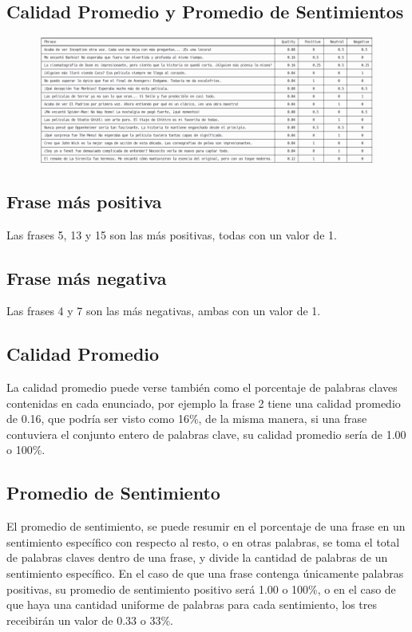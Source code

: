 \documentclass{article}
\begin{document}
    \newpage

    \subsection{Calidad Promedio y Promedio de Sentimientos}
    \begin{figure}[H]
        \centering
        \includegraphics[width=1\linewidth]{assets/results}
    \end{figure}


    \subsection{Frase más positiva}
    Las frases 5, 13 y 15 son las más positivas, todas con un valor de 1.

    \subsection{Frase más negativa}
    Las frases 4 y 7 son las más negativas, ambas con un valor de 1.

    \subsection{Calidad Promedio}
    La calidad promedio puede verse también como el porcentaje de palabras claves contenidas en cada enunciado, por ejemplo la frase 2 tiene una calidad promedio de 0.16, que podría ser visto como 16\%, de la misma manera, si una frase contuviera el conjunto entero de palabras clave, su calidad promedio sería de 1.00 o 100\%.

    \subsection{Promedio de Sentimiento}
    El promedio de sentimiento, se puede resumir en el porcentaje de una frase en un sentimiento específico con respecto al resto, o en otras palabras, se toma el total de palabras claves dentro de una frase, y divide la cantidad de palabras de un sentimiento específico. En el caso de que una frase contenga únicamente palabras positivas, su promedio de sentimiento positivo será 1.00 o 100\%, o en el caso de que haya una cantidad uniforme de palabras para cada sentimiento, los tres receibirán un valor de 0.33 o 33\%.
\end{document}
